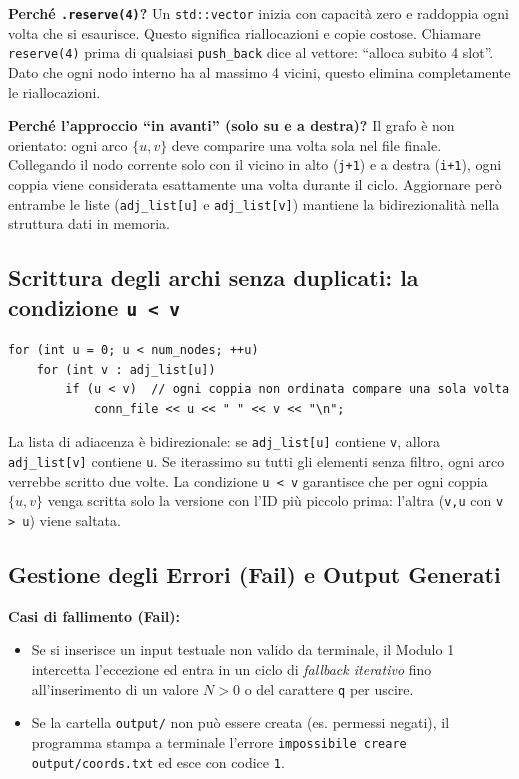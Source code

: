 \documentclass[a4paper,11pt]{article}
\theoremstyle{definition}
\begin{document}
\textbf{Perché \texttt{.reserve(4)}?} Un \texttt{std::vector} inizia con capacità zero e raddoppia ogni volta che si esaurisce. Questo significa riallocazioni e copie costose. Chiamare \texttt{reserve(4)} prima di qualsiasi \texttt{push\_back} dice al vettore: ``alloca subito 4 slot''. Dato che ogni nodo interno ha al massimo 4 vicini, questo elimina completamente le riallocazioni.

\textbf{Perché l'approccio ``in avanti'' (solo su e a destra)?} Il grafo è non orientato: ogni arco $\{u,v\}$ deve comparire una volta sola nel file finale. Collegando il nodo corrente solo con il vicino in alto (\texttt{j+1}) e a destra (\texttt{i+1}), ogni coppia viene considerata esattamente una volta durante il ciclo. Aggiornare però entrambe le liste (\texttt{adj\_list[u]} e \texttt{adj\_list[v]}) mantiene la bidirezionalità nella struttura dati in memoria.

\subsection{Scrittura degli archi senza duplicati: la condizione \texttt{u < v}}

\begin{lstlisting}[style=cpp, caption={Filtro u < v per evitare archi duplicati nel file}]
for (int u = 0; u < num_nodes; ++u)
    for (int v : adj_list[u])
        if (u < v)  // ogni coppia non ordinata compare una sola volta
            conn_file << u << " " << v << "\n";
\end{lstlisting}

La lista di adiacenza è bidirezionale: se \texttt{adj\_list[u]} contiene \texttt{v}, allora \texttt{adj\_list[v]} contiene \texttt{u}. Se iterassimo su tutti gli elementi senza filtro, ogni arco verrebbe scritto due volte. La condizione \texttt{u < v} garantisce che per ogni coppia $\{u,v\}$ venga scritta solo la versione con l'ID più piccolo prima: l'altra (\texttt{v,u} con \texttt{v > u}) viene saltata.

\subsection{Gestione degli Errori (Fail) e Output Generati}
\textbf{Casi di fallimento (Fail):}
\begin{itemize}
  \item Se si inserisce un input testuale non valido da terminale, il Modulo 1 intercetta l'eccezione ed entra in un ciclo di \emph{fallback iterativo} fino all'inserimento di un valore $N > 0$ o del carattere \texttt{q} per uscire.
  \item Se la cartella \texttt{output/} non può essere creata (es. permessi negati), il programma stampa a terminale l'errore \texttt{impossibile creare output/coords.txt} ed esce con codice \texttt{1}.
\end{itemize}
\end{document}
